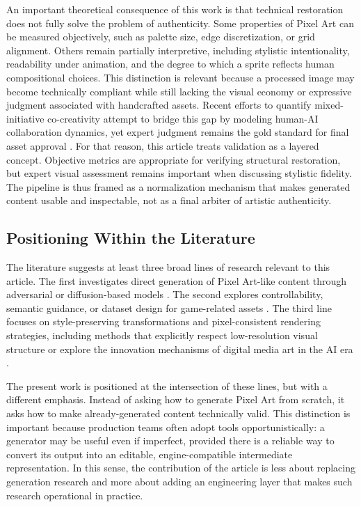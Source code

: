 \documentclass[runningheads]{llncs}
\begin{document}
An important theoretical consequence of this work is that technical restoration does not fully solve the problem of authenticity. Some properties of Pixel Art can be measured objectively, such as palette size, edge discretization, or grid alignment. Others remain partially interpretive, including stylistic intentionality, readability under animation, and the degree to which a sprite reflects human compositional choices. This distinction is relevant because a processed image may become technically compliant while still lacking the visual economy or expressive judgment associated with handcrafted assets. Recent efforts to quantify mixed-initiative co-creativity attempt to bridge this gap by modeling human-AI collaboration dynamics, yet expert judgment remains the gold standard for final asset approval \cite{margarido2024miccy}. For that reason, this article treats validation as a layered concept. Objective metrics are appropriate for verifying structural restoration, but expert visual assessment remains important when discussing stylistic fidelity. The pipeline is thus framed as a normalization mechanism that makes generated content usable and inspectable, not as a final arbiter of artistic authenticity.

\subsection{Positioning Within the Literature}

The literature suggests at least three broad lines of research relevant to this article. The first investigates direct generation of Pixel Art-like content through adversarial or diffusion-based models \cite{coutinho2024pixel,kim2023game,chen2023pixart,serpa2019towards}. The second explores controllability, semantic guidance, or dataset design for game-related assets \cite{chen2025gametilenet,gallotta2025importance,merino2023five}. The third line focuses on style-preserving transformations and pixel-consistent rendering strategies, including methods that explicitly respect low-resolution visual structure or explore the innovation mechanisms of digital media art in the AI era \cite{coutinho2024missing,coutinho2025imputation,ekpete2023pixelperfect,ubaid2025realizing,liang2025research}.

The present work is positioned at the intersection of these lines, but with a different emphasis. Instead of asking how to generate Pixel Art from scratch, it asks how to make already-generated content technically valid. This distinction is important because production teams often adopt tools opportunistically: a generator may be useful even if imperfect, provided there is a reliable way to convert its output into an editable, engine-compatible intermediate representation. In this sense, the contribution of the article is less about replacing generation research and more about adding an engineering layer that makes such research operational in practice.
\end{document}
